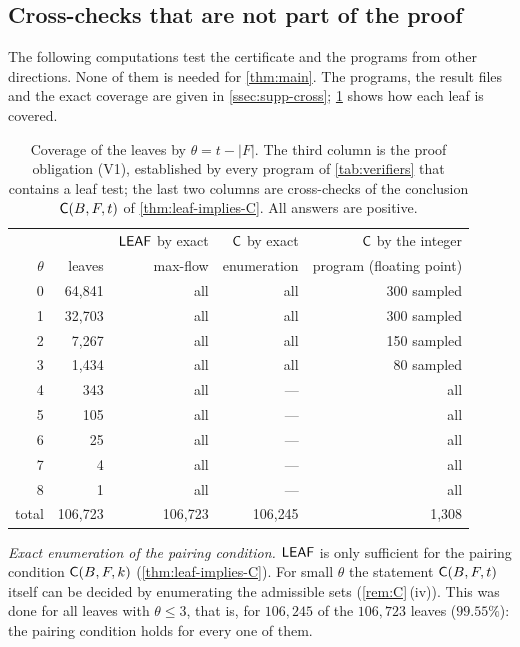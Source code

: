 \subsection{Cross-checks that are not part of the proof}\label{ssec:cross}

The following computations test the certificate and the programs from other directions. None of them is
needed for \cref{thm:main}. The programs, the result files and the exact coverage are given in
\cref{ssec:supp-cross}; \cref{tab:leaves} shows how each leaf is covered.

\begin{table}[ht]
\centering\small
\begin{tabular}{@{}rrrrr@{}}
\toprule
 & & $\mathsf{LEAF}$ by exact & $\mathsf{C}$ by exact & $\mathsf{C}$ by the integer\\
$\theta$ & leaves & max-flow & enumeration & program (floating point)\\
\midrule
0 & 64{,}841 & all & all & 300 sampled\\
1 & 32{,}703 & all & all & 300 sampled\\
2 & 7{,}267 & all & all & 150 sampled\\
3 & 1{,}434 & all & all & 80 sampled\\
4 & 343 & all & --- & all\\
5 & 105 & all & --- & all\\
6 & 25 & all & --- & all\\
7 & 4 & all & --- & all\\
8 & 1 & all & --- & all\\
\midrule
total & 106{,}723 & 106{,}723 & 106{,}245 & 1{,}308\\
\bottomrule
\end{tabular}
\caption{Coverage of the leaves by $\theta=t-|F|$. The third column is the proof obligation (V1),
established by every program of \cref{tab:verifiers} that contains a leaf test; the last two columns are
cross-checks of the conclusion $\mathsf{C}(B,F,t)$ of \cref{thm:leaf-implies-C}. All answers are positive.}
\label{tab:leaves}
\end{table}

\emph{Exact enumeration of the pairing condition.} $\mathsf{LEAF}$ is only sufficient for the pairing condition
$\mathsf{C}(B,F,k)$ (\cref{thm:leaf-implies-C}). For small $\theta$ the statement $\mathsf{C}(B,F,t)$ itself can be
decided by enumerating the admissible sets (\cref{rem:C}\,(iv)). This was done for all leaves with
$\theta\le3$, that is, for $106{,}245$ of the $106{,}723$ leaves ($99.55\%$): the pairing condition holds
for every one of them.

